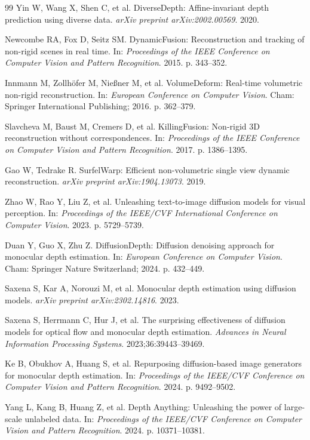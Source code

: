 \documentclass[pdflatex,sn-mathphys-num]{sn-jnl}
\begin{document}
\begin{thebibliography}{99}
Yin W, Wang X, Shen C, et al. DiverseDepth: Affine-invariant depth prediction using diverse data. \textit{arXiv preprint arXiv:2002.00569}. 2020.

Newcombe RA, Fox D, Seitz SM. DynamicFusion: Reconstruction and tracking of non-rigid scenes in real time. In: \textit{Proceedings of the IEEE Conference on Computer Vision and Pattern Recognition}. 2015. p. 343--352.

Innmann M, Zollh\"{o}fer M, Nie\ss ner M, et al. VolumeDeform: Real-time volumetric non-rigid reconstruction. In: \textit{European Conference on Computer Vision}. Cham: Springer International Publishing; 2016. p. 362--379.

Slavcheva M, Baust M, Cremers D, et al. KillingFusion: Non-rigid 3D reconstruction without correspondences. In: \textit{Proceedings of the IEEE Conference on Computer Vision and Pattern Recognition}. 2017. p. 1386--1395.

Gao W, Tedrake R. SurfelWarp: Efficient non-volumetric single view dynamic reconstruction. \textit{arXiv preprint arXiv:1904.13073}. 2019.

Zhao W, Rao Y, Liu Z, et al. Unleashing text-to-image diffusion models for visual perception. In: \textit{Proceedings of the IEEE/CVF International Conference on Computer Vision}. 2023. p. 5729--5739.

Duan Y, Guo X, Zhu Z. DiffusionDepth: Diffusion denoising approach for monocular depth estimation. In: \textit{European Conference on Computer Vision}. Cham: Springer Nature Switzerland; 2024. p. 432--449.

Saxena S, Kar A, Norouzi M, et al. Monocular depth estimation using diffusion models. \textit{arXiv preprint arXiv:2302.14816}. 2023.

Saxena S, Herrmann C, Hur J, et al. The surprising effectiveness of diffusion models for optical flow and monocular depth estimation. \textit{Advances in Neural Information Processing Systems}. 2023;36:39443--39469.

Ke B, Obukhov A, Huang S, et al. Repurposing diffusion-based image generators for monocular depth estimation. In: \textit{Proceedings of the IEEE/CVF Conference on Computer Vision and Pattern Recognition}. 2024. p. 9492--9502.

Yang L, Kang B, Huang Z, et al. Depth Anything: Unleashing the power of large-scale unlabeled data. In: \textit{Proceedings of the IEEE/CVF Conference on Computer Vision and Pattern Recognition}. 2024. p. 10371--10381.


\end{thebibliography}
\end{document}
